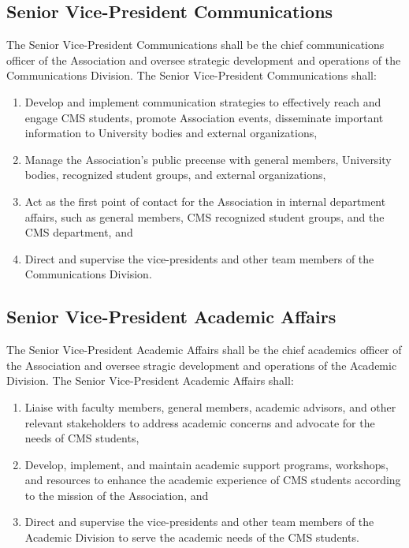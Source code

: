 \subsection{Senior Vice-President Communications}
The Senior Vice-President Communications shall be the chief
communications officer of the Association and oversee strategic
development and operations of the Communications Division. 
The Senior Vice-President Communications shall:
\begin{enumerate}

    \item Develop and implement communication strategies to effectively
    reach and engage CMS students, promote Association events, disseminate
    important information to University bodies and external organizations,

    \item Manage the Association's public precense with general members,
    University bodies, recognized student groups, and external organizations,

    \item Act as the first point of contact for the
    Association in internal department affairs, such as general members,
    CMS recognized student groups, and the CMS department, and 

    \item Direct and supervise the vice-presidents and other team 
    members of the Communications Division.

\end{enumerate}

\subsection{Senior Vice-President Academic Affairs}
The Senior Vice-President Academic Affairs shall be the chief
academics officer of the Association and oversee stragic development
and operations of the Academic Division. 
    The Senior Vice-President Academic Affairs shall:
\begin{enumerate}

    \item Liaise with faculty members, general members, academic 
    advisors, and other relevant stakeholders to address academic 
    concerns and advocate for the needs of CMS students,

    \item Develop, implement, and maintain academic support programs,
    workshops, and resources to enhance the academic experience of 
    CMS students according to the mission of the Association, and

    \item Direct and supervise the vice-presidents and other team 
    members of the Academic Division to serve the academic needs of 
    the CMS students.

\end{enumerate}

